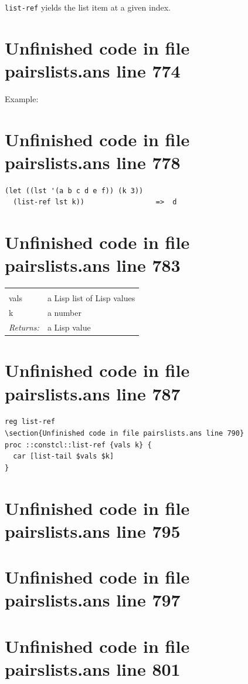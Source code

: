 \documentclass[twoside,9pt]{report}
\begin{document}
\texttt{list-ref} yields the list item at a given index.

\section{Unfinished code in file pairslists.ans line 774}


Example:

\section{Unfinished code in file pairslists.ans line 778}
\begin{verbatim}
(let ((lst '(a b c d e f)) (k 3))
  (list-ref lst k))                 =>  d
\end{verbatim}
\section{Unfinished code in file pairslists.ans line 783}
\noindent\begin{tabular}{ |p{1.9cm} p{8cm}| }
\hline
\rowcolor[HTML]{CCCCCC} \multicolumn{2}{|l|}{\bf list-ref (public)} \\
vals & a Lisp list of Lisp values \\
k & a number \\
\textit{Returns:} & a Lisp value \\
\hline
\end{tabular}
\section{Unfinished code in file pairslists.ans line 787}
\begin{lstlisting}
reg list-ref
\section{Unfinished code in file pairslists.ans line 790}
proc ::constcl::list-ref {vals k} {
  car [list-tail $vals $k]
}
\end{lstlisting}
\section{Unfinished code in file pairslists.ans line 795}
\section{Unfinished code in file pairslists.ans line 797}
\section{Unfinished code in file pairslists.ans line 801}
\end{document}

